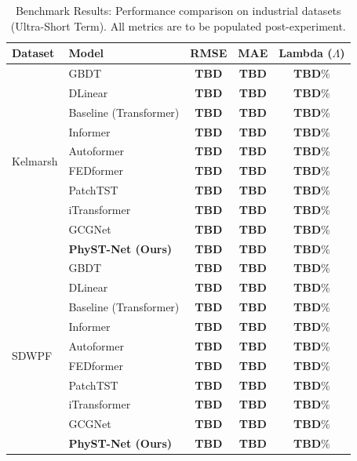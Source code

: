 \begin{table}[htbp]
\centering
\caption{Benchmark Results: Performance comparison on industrial datasets (Ultra-Short Term). All metrics are to be populated post-experiment.}
\label{tab:nuclear_results_modular}
\begin{tabular}{@{}llccc@{}}
\toprule
\textbf{Dataset} & \textbf{Model} & \textbf{RMSE} & \textbf{MAE} & \textbf{Lambda ($\Lambda$)} \\
\midrule
\multirow{10}{*}{Kelmarsh} & GBDT & \textbf{TBD} & \textbf{TBD} & \textbf{TBD}\% \\
 & DLinear & \textbf{TBD} & \textbf{TBD} & \textbf{TBD}\% \\
 & Baseline (Transformer) & \textbf{TBD} & \textbf{TBD} & \textbf{TBD}\% \\
 & Informer & \textbf{TBD} & \textbf{TBD} & \textbf{TBD}\% \\
 & Autoformer & \textbf{TBD} & \textbf{TBD} & \textbf{TBD}\% \\
 & FEDformer & \textbf{TBD} & \textbf{TBD} & \textbf{TBD}\% \\
 & PatchTST & \textbf{TBD} & \textbf{TBD} & \textbf{TBD}\% \\
 & iTransformer & \textbf{TBD} & \textbf{TBD} & \textbf{TBD}\% \\
 & GCGNet & \textbf{TBD} & \textbf{TBD} & \textbf{TBD}\% \\
 & \textbf{PhyST-Net (Ours)} & \textbf{TBD} & \textbf{TBD} & \textbf{TBD}\% \\
\midrule
\multirow{10}{*}{SDWPF} & GBDT & \textbf{TBD} & \textbf{TBD} & \textbf{TBD}\% \\
 & DLinear & \textbf{TBD} & \textbf{TBD} & \textbf{TBD}\% \\
 & Baseline (Transformer) & \textbf{TBD} & \textbf{TBD} & \textbf{TBD}\% \\
 & Informer & \textbf{TBD} & \textbf{TBD} & \textbf{TBD}\% \\
 & Autoformer & \textbf{TBD} & \textbf{TBD} & \textbf{TBD}\% \\
 & FEDformer & \textbf{TBD} & \textbf{TBD} & \textbf{TBD}\% \\
 & PatchTST & \textbf{TBD} & \textbf{TBD} & \textbf{TBD}\% \\
 & iTransformer & \textbf{TBD} & \textbf{TBD} & \textbf{TBD}\% \\
 & GCGNet & \textbf{TBD} & \textbf{TBD} & \textbf{TBD}\% \\
 & \textbf{PhyST-Net (Ours)} & \textbf{TBD} & \textbf{TBD} & \textbf{TBD}\% \\

\end{tabular}
\end{table}
